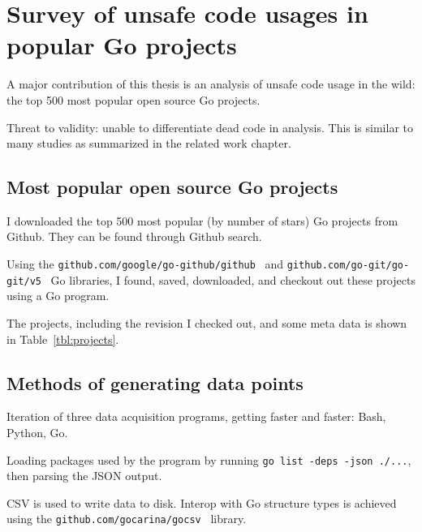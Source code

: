 
\chapter{Survey of unsafe code usages in popular Go projects}\label{ch:survey}

A major contribution of this thesis is an analysis of unsafe code usage in the wild:
the top 500 most popular open source Go projects.

Threat to validity: unable to differentiate dead code in analysis.
This is similar to many studies as summarized in the related work chapter.


\section{Most popular open source Go projects}\label{sec:most-popular-projects}

I downloaded the top 500 most popular (by number of stars) Go projects from Github.
They can be found through Github search.

Using the \texttt{github.com/google/go-github/github}~\cite{NEEDED} and \texttt{github.com/go-git/go-git/v5}~\cite{NEEDED}
Go libraries, I found, saved, downloaded, and checkout out these projects using a Go program.

The projects, including the revision I checked out, and some meta data is shown in Table~\ref{tbl:projects}.



\section{Methods of generating data points}\label{sec:survey-acquisition-methods}

Iteration of three data acquisition programs, getting faster and faster: Bash, Python, Go.

Loading packages used by the program by running \texttt{go list -deps -json ./...}, then parsing the JSON output.

CSV is used to write data to disk.
Interop with Go structure types is achieved using the \texttt{github.com/gocarina/gocsv}~\cite{NEEDED} library.

